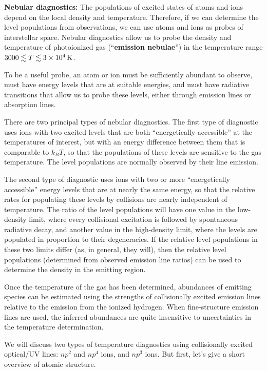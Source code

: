 \documentclass[a4paper,10pt]{article}
\begin{document}
{\noindent}\textbf{Nebular diagnostics:} The populations of excited states of atoms and ions depend on the local density and temperature. Therefore, if we can determine the level populations from observations, we can use atoms and ions as probes of interstellar space. Nebular diagnostics allow us to probe the density and temperature of photoionized gas (``\textbf{emission nebulae}'') in the temperature range $3000\lesssim T\lesssim3\times10^4\,{\rm K}$.

{\noindent}To be a useful probe, an atom or ion must be sufficiently abundant to observe, must have energy levels that are at suitable energies, and must have radiative transitions that allow us to probe these levels, either through emission lines or absorption lines.

{\noindent}There are two principal types of nebular diagnostics. The first type of diagnostic uses ions with two excited levels that are both ``energetically accessible'' at the temperatures of interest, but with an energy difference between them that is comparable to $k_BT$, so that the populations of these levels are sensitive to the gas temperature. The level populations are normally observed by their line emission.

{\noindent}The second type of diagnostic uses ions with two or more ``energetically accessible'' energy levels that are at nearly the same energy, so that the relative rates for populating these levels by collisions are nearly independent of temperature. The ratio of the level populations will have one value in the low-density limit, where every collisional excitation is followed by spontaneous radiative decay, and another value in the high-density limit, where the levels are populated in proportion to their degeneracies. If the relative level populations in these two limits differ (as, in general, they will), then the relative level populations (determined from observed emission line ratios) can be used to determine the density in the emitting region.

{\noindent}Once the temperature of the gas has been determined, abundances of emitting species can be estimated using the strengths of collisionally excited emission lines relative to the emission from the ionized hydrogen. When fine-structure emission lines are used, the inferred abundances are quite insensitive to uncertainties in the temperature determination.

{\noindent}We will discuss two types of temperature diagnostics using collisionally excited optical/UV lines: $np^2$ and $np^4$ ions, and $np^3$ ions. But first, let's give a short overview of atomic structure.
\end{document}
